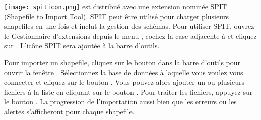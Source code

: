 \texttt{[image: spiticon.png]} \qg est distribué avec une extension nommée SPIT (Shapefile to \pg Import Tool). SPIT peut être utilisé pour charger plusieurs shapefiles en une fois et inclut la gestion des schémas. Pour utiliser SPIT, ouvrez le Gestionnaire d'extensions depuis le menu , cochez la case adjacente à  et cliquez sur . L'icône SPIT sera ajoutée à la barre d'outils.

Pour importer un shapefile, cliquez sur le bouton  dans la barre d'outils pour ouvrir la fenêtre . Sélectionnez la base de données à laquelle vous voulez vous connecter et cliquez sur le bouton . Vous pouvez alors ajouter un ou plusieurs fichiers à la liste en cliquant sur le bouton . Pour traiter les fichiers, appuyez sur le bouton . La progression de l'importation aussi bien que les erreurs ou les alertes s'afficheront pour chaque shapefile.

